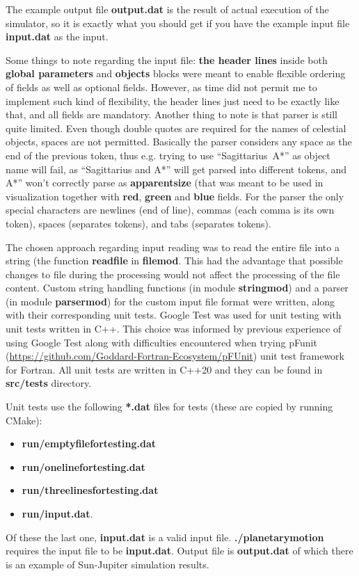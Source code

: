 \documentclass[12pt]{scrartcl}
\begin{document}
The example output file \textbf{output.dat} is the result of actual execution of the simulator, so it is exactly what you should get if you have the example input file \textbf{input.dat} as the input.

Some things to note regarding the input file: \textbf{the header lines} inside both \textbf{global parameters} and \textbf{objects} blocks were meant to enable flexible ordering of fields as well as optional fields. However, as time did not permit me to implement such kind of flexibility, the header lines just need to be exactly like that, and all fields are mandatory. Another thing to note is that parser is still quite limited. Even though double quotes are required for the names of celestial objects, spaces are not permitted. Basically the parser considers any space as the end of the previous token, thus e.g. trying to use \hbox{``Sagittarius A*''} as object name will fail, as ``Sagittarius and A*'' will get parsed into different tokens, and A*'' won't correctly parse as \textbf{apparent\textunderscore{}size} (that was meant to be used in visualization together with \textbf{red}, \textbf{green} and \textbf{blue} fields. For the parser the only special characters are newlines (end of line), commas (each comma is its own token), spaces (separates tokens), and tabs (separates tokens).

The chosen approach regarding input reading was to read the entire file into a string (the function \textbf{read\textunderscore{}file} in \textbf{file\textunderscore{}mod}. This had the advantage that possible changes to file during the processing would not affect the processing of the file content. Custom string handling functions (in module \textbf{string\textunderscore{}mod}) and a parser (in module \textbf{parser\textunderscore{}mod}) for the custom input file format were written, along with their corresponding unit tests. Google Test was used for unit testing with unit tests written in C++. This choice was informed by previous experience of using Google Test along with difficulties encountered when trying pFunit (\url{https://github.com/Goddard-Fortran-Ecosystem/pFUnit}) unit test framework for Fortran. All unit tests are written in C++20 and they can be found in \textbf{src/tests} directory.

Unit tests use the following \textbf{*.dat} files for tests (these are copied by running CMake):
\begin{itemize}
    \item \textbf{run/empty\textunderscore{}file\textunderscore{}for\textunderscore{}testing.dat}
    \item \textbf{run/one\textunderscore{}line\textunderscore{}for\textunderscore{}testing.dat}
    \item \textbf{run/three\textunderscore{}lines\textunderscore{}for\textunderscore{}testing.dat}
    \item \textbf{run/input.dat}.
\end{itemize}
Of these the last one, \textbf{input.dat} is a valid input file. \textbf{./planetary\textunderscore{}motion} requires the input file to be \textbf{input.dat}. Output file is \textbf{output.dat} of which there is an example of Sun-Jupiter simulation results.
\end{document}
